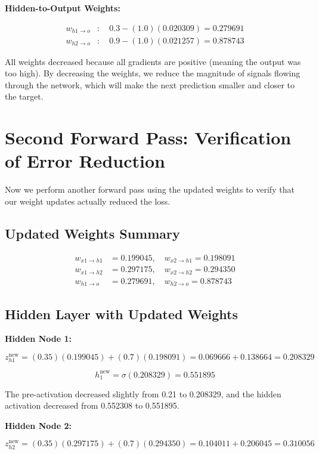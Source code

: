 \documentclass[12pt]{article}
\begin{document}
\noindent\textbf{Hidden-to-Output Weights:}

\begin{align*}
w_{h1 \to o} &: \quad 0.3 - (1.0)(0.020309) = 0.279691 \\
w_{h2 \to o} &: \quad 0.9 - (1.0)(0.021257) = 0.878743
\end{align*}

All weights decreased because all gradients are positive (meaning the output was too high). By decreasing the weights, we reduce the magnitude of signals flowing through the network, which will make the next prediction smaller and closer to the target.

\section*{Second Forward Pass: Verification of Error Reduction}

Now we perform another forward pass using the updated weights to verify that our weight updates actually reduced the loss.

\subsection*{Updated Weights Summary}

\begin{align*}
w_{x1 \to h1} &= 0.199045, \quad w_{x2 \to h1} = 0.198091 \\
w_{x1 \to h2} &= 0.297175, \quad w_{x2 \to h2} = 0.294350 \\
w_{h1 \to o} &= 0.279691, \quad w_{h2 \to o} = 0.878743
\end{align*}

\subsection*{Hidden Layer with Updated Weights}

\noindent\textbf{Hidden Node 1:}

\[
z_{h1}^{\text{new}} = (0.35)(0.199045) + (0.7)(0.198091) = 0.069666 + 0.138664 = 0.208329
\]

\[
h_1^{\text{new}} = \sigma(0.208329) = 0.551895
\]

The pre-activation decreased slightly from 0.21 to 0.208329, and the hidden activation decreased from 0.552308 to 0.551895.

\noindent\textbf{Hidden Node 2:}

\[
z_{h2}^{\text{new}} = (0.35)(0.297175) + (0.7)(0.294350) = 0.104011 + 0.206045 = 0.310056
\]
\end{document}
